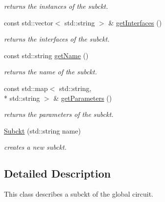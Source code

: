 \begin{DoxyCompactItemize}
\begin{DoxyCompactList}\small\item\em returns the instances of the subckt. \end{DoxyCompactList}\item 
\hypertarget{class_s_p_i_c_e_1_1_subckt_a5df00fe6eb5e287abef28c76ce88bd1e}{const std\-::vector$<$ std\-::string $>$ \& \hyperlink{class_s_p_i_c_e_1_1_subckt_a5df00fe6eb5e287abef28c76ce88bd1e}{get\-Interfaces} ()}\label{class_s_p_i_c_e_1_1_subckt_a5df00fe6eb5e287abef28c76ce88bd1e}

\begin{DoxyCompactList}\small\item\em returns the interfaces of the subckt. \end{DoxyCompactList}\item 
\hypertarget{class_s_p_i_c_e_1_1_subckt_af55b1fe10eacd22c7ff3544b5ed32ef3}{const std\-::string \hyperlink{class_s_p_i_c_e_1_1_subckt_af55b1fe10eacd22c7ff3544b5ed32ef3}{get\-Name} ()}\label{class_s_p_i_c_e_1_1_subckt_af55b1fe10eacd22c7ff3544b5ed32ef3}

\begin{DoxyCompactList}\small\item\em returns the name of the subckt. \end{DoxyCompactList}\item 
\hypertarget{class_s_p_i_c_e_1_1_subckt_aee7d59083b78d31ac5c19ab508da91e0}{const std\-::map$<$ std\-::string, \\*
std\-::string $>$ \& \hyperlink{class_s_p_i_c_e_1_1_subckt_aee7d59083b78d31ac5c19ab508da91e0}{get\-Parameters} ()}\label{class_s_p_i_c_e_1_1_subckt_aee7d59083b78d31ac5c19ab508da91e0}

\begin{DoxyCompactList}\small\item\em returns the parameters of the subckt. \end{DoxyCompactList}\item 
\hyperlink{class_s_p_i_c_e_1_1_subckt_a5b9ee31a0302af435029f29a93b29d7d}{Subckt} (std\-::string name)
\begin{DoxyCompactList}\small\item\em creates a new subckt. \end{DoxyCompactList}\end{DoxyCompactItemize}


\subsection{Detailed Description}
This class describes a subckt of the global circuit. 

